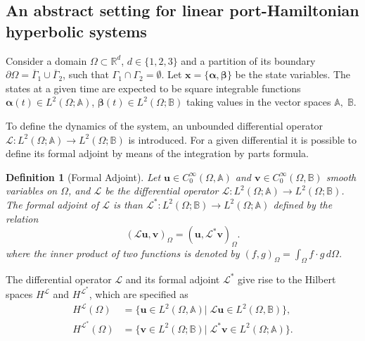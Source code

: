 \documentclass[11pt,a4paper]{article}
\newcommand{\innerproduct}[3][\Omega]{(#2, #3)_{#1}}
\newtheorem{definition}{Definition}
\begin{document}
\subsection{An abstract setting for linear port-Hamiltonian hyperbolic systems}

Consider a domain $\Omega\subset \mathbb{R}^d$, $d\in\{1,2,3\}$ and a partition of its boundary $\partial\Omega=\overline{\Gamma}_1\cup\overline{\Gamma}_2$, such that $\Gamma_1\cap\Gamma_2=\emptyset$. Let $\bm{x}=\{\bm{\alpha},\bm{\beta}\}$ be the state variables. The states at a given time are expected to be square integrable functions $\bm{\alpha}(t) \in L^2(\Omega; \mathbb{A})$, $\bm{\beta}(t) \in L^2(\Omega; \mathbb{B})$ taking values in the vector spaces $\mathbb{A}, \; \mathbb{B}$. 



To define the dynamics of the system, an unbounded differential operator $\mathcal{L} :L^2(\Omega; \mathbb{A})\rightarrow L^2(\Omega; \mathbb{B})$ is introduced. For a given differential it is possible to define its formal adjoint by means of the integration by parts formula.
\begin{definition}[Formal Adjoint]\label{def:adjoint}
    Let $\bm{u}\in C_0^\infty(\Omega,\mathbb{A})$ and $\bm{v}\in C_0^\infty(\Omega,\mathbb{B})$ smooth variables on $\Omega$, and $\mathcal{L}$ be the differential operator $\mathcal{L}:L^2(\Omega; \mathbb{A})\rightarrow L^2(\Omega; \mathbb{B})$. The formal adjoint of $\mathcal{L}$ is than $\mathcal{L^*}:L^2(\Omega; \mathbb{B})\rightarrow L^2(\Omega; \mathbb{A})$ defined by the relation
    \begin{equation}
        \innerproduct{\mathcal{L}\bm{u}}{\bm{v}} = \innerproduct{\bm{u}}{\mathcal{L}^*\bm{v}}.
    \end{equation}
    where the inner product of two functions is denoted by $\innerproduct{f}{g} = \int_\Omega f \cdot g \, d{\Omega}$.
\end{definition}
The differential operator $\mathcal{L}$ and its formal adjoint $\mathcal{L}^*$ give rise to the Hilbert spaces $H^\mathcal{L}$ and $H^{\mathcal{L}^*}$, which are specified as
\begin{equation}
    \begin{split}
        H^\mathcal{L}(\Omega) &= \{\bm{u} \in L^2(\Omega,\mathbb{A})|\; \mathcal{L}\bm{u} \in L^2(\Omega,\mathbb{B})\}, \\
        H^{\mathcal{L}^*}(\Omega) &= \{\bm{v} \in L^2(\Omega; \mathbb{B})|\; \mathcal{L}^*\bm{v} \in L^2(\Omega; \mathbb{A})\}.
    \end{split}
\label{eq:Spaces-H^L-H^L*}
\end{equation}
\end{document}

